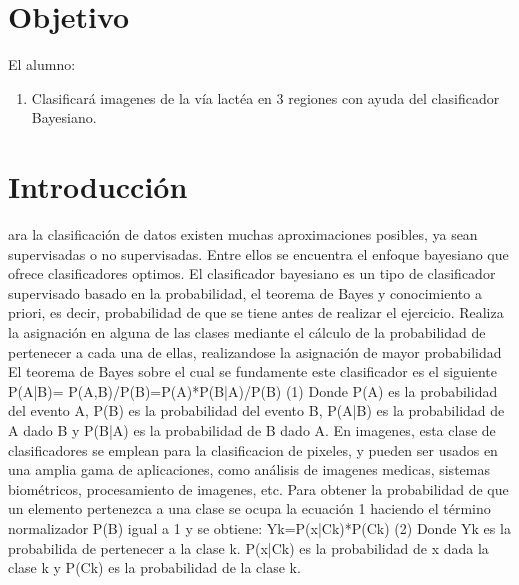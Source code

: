 \documentclass[10pt,journal,compsoc]{IEEEtran}\usepackage[T1]{fontenc}                              %
\begin{document}
\section{Objetivo}

El alumno:

\begin{enumerate}
  \item Clasificará imagenes de la vía lactéa en 3 regiones con ayuda del clasificador Bayesiano.
\end{enumerate}



\section{Introducción}
 
ara la clasificación de datos existen muchas aproximaciones posibles, ya sean supervisadas o no supervisadas. Entre ellos se encuentra el enfoque bayesiano que ofrece clasificadores optimos.
El clasificador bayesiano es un tipo de clasificador supervisado basado en la probabilidad, el teorema de Bayes y conocimiento a priori, es decir, probabilidad de que se tiene antes de realizar el ejercicio. Realiza la asignación en alguna de las clases mediante el cálculo de la probabilidad de pertenecer a cada una de ellas, realizandose la asignación de mayor probabilidad
El teorema de Bayes sobre el cual se fundamente este clasificador es el siguiente
P(A|B)= P(A,B)/P(B)=P(A)*P(B|A)/P(B)						(1)
Donde P(A) es la probabilidad del evento A, P(B) es la probabilidad del evento B, P(A|B) es la probabilidad de A dado B y P(B|A) es la probabilidad de B dado A.
En imagenes, esta clase de clasificadores se emplean para la clasificacion de pixeles, y pueden ser usados en una amplia gama de aplicaciones, como análisis de imagenes medicas, sistemas biométricos, procesamiento de imagenes, etc.
Para obtener la probabilidad de que un elemento pertenezca a una clase se ocupa la ecuación 1 haciendo el término normalizador P(B) igual a 1 y se obtiene:
Yk=P(x|Ck)*P(Ck)					(2)
Donde Yk es la probabilida de pertenecer a la clase k.
P(x|Ck) es la probabilidad de x dada la clase k y P(Ck) es la probabilidad de la clase k.
\end{document}
